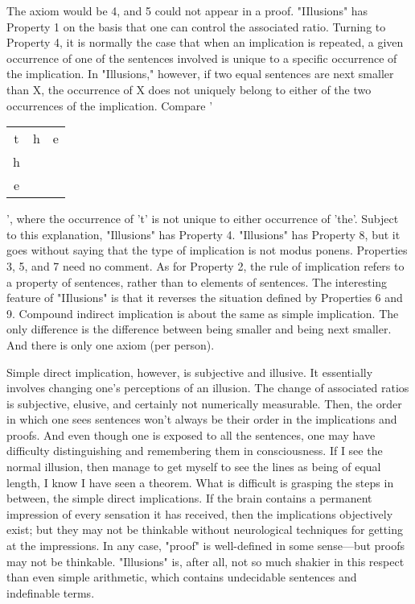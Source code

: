 The axiom would be 4, and 5 could not appear in a proof. "IIlusions" has 
Property 1 on the basis that one can control the associated ratio. Turning to 
Property 4, it is normally the case that when an implication is repeated, a 
given occurrence of one of the sentences involved is unique to a specific 
occurrence of the implication. In "Illusions," however, if two equal 
sentences are next smaller than X, the occurrence of X does not uniquely 
	belong to either of the two occurrences of the implication. Compare '\begin{tabular}{c c c} t & h & e \\ h &   &   \\ e &   & \end{tabular}', 
where the occurrence of 't' is not unique to either occurrence of 'the'. 
Subject to this explanation, "Illusions" has Property 4. "Illusions" has 
Property 8, but it goes without saying that the type of implication is not 
modus ponens. Properties 3, 5, and 7 need no comment. As for Property 2, 
the rule of implication refers to a property of sentences, rather than to 
elements of sentences. The interesting feature of "IIlusions" is that it 
reverses the situation defined by Properties 6 and 9. Compound indirect 
implication is about the same as simple implication. The only difference is 
the difference between being smaller and being next smaller. And there is 
only one axiom (per person). 

Simple direct implication, however, is subjective and illusive. It 
essentially involves changing one's perceptions of an illusion. The change of 
associated ratios is subjective, elusive, and certainly not numerically 
measurable. Then, the order in which one sees sentences won't always be 
their order in the implications and proofs. And even though one is exposed 
to all the sentences, one may have difficulty distinguishing and remembering 
them in consciousness. If I see the normal illusion, then manage to get 
myself to see the lines as being of equal length, I know I have seen a 
theorem. What is difficult is grasping the steps in between, the simple direct 
implications. If the brain contains a permanent impression of every sensation 
it has received, then the implications objectively exist; but they may not be 
thinkable without neurological techniques for getting at the impressions. In 
any case, "proof" is well-defined in some sense---but proofs may not be 
thinkable. "Illusions" is, after all, not so much shakier in this respect than 
even simple arithmetic, which contains undecidable sentences and 
indefinable terms. 

